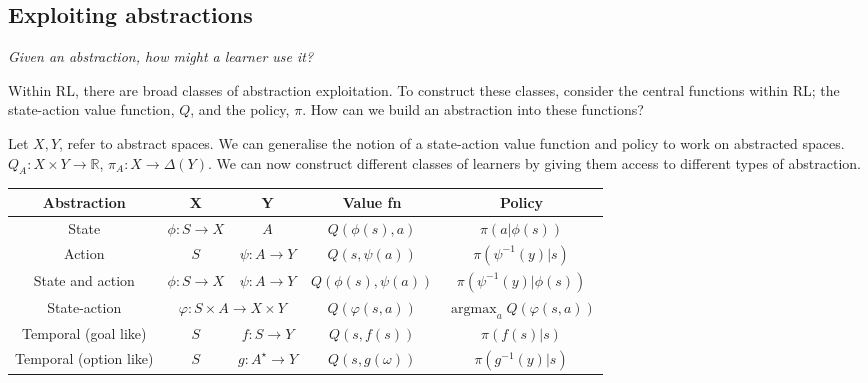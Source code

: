 \subsection{Exploiting abstractions}\label{exploit-abstraction-rl}

%

\begin{displayquote}
\textsl{Given an abstraction, how might a learner use it?}
\end{displayquote}

Within RL, there are broad classes of abstraction exploitation. To construct these classes,
consider the central functions within RL; the state-action value function, $Q$, and the policy, $\pi$.
How can we build an abstraction into these functions?

Let $X, Y$, refer to abstract spaces. We can generalise the notion of a state-action value function and policy to work on abstracted spaces.
$Q_A: X \times Y \to \mathbb R$, $\pi_A: X \to \Delta(Y)$. We can now construct
different classes of learners by giving them access to different types of abstraction.

\vspace{5mm}

\begin{changemargin}{-3cm}{-3cm}
  \begin{center}
    \begin{tabular}{ c || c | c | c | c }
      Abstraction & \textbf{X} & \textbf{Y} & \textbf{Value fn} & \textbf{Policy} \\ \hline \hline
      State & $\phi: S \to X$ & $A$ & $Q(\phi(s), a)$ & $\pi(a| \phi(s))$ \\ \hline
      Action & $S$ & $\psi: A \to Y$ & $Q(s, \psi(a))$ & $\pi(\psi^{-1}(y) | s)$\\ \hline
      State and action \footnotemark & $\phi: S \to X$ & $\psi: A \to Y$ & $Q(\phi(s), \psi(a))$ & $\pi(\psi^{-1}(y) | \phi(s))$ \\ \hline
      State-action & \multicolumn{2}{c|}{$\varphi: S\times A \to X\times Y$} & $Q(\varphi(s, a))$ & $\mathop{\text{argmax}}_a Q(\varphi(s, a))$ \\ \hline
      Temporal (goal like)\footnotemark & $S$ & $f: S \to Y$ & $Q(s, f(s))$ &  $\pi(f(s)|s)$ \\ \hline
      Temporal (option like) & $S$ & $g: A^{\star} \to Y$ & $Q(s, g(\omega))$ & $\pi(g^{-1}(y) | s)$ \\ \hline
    \end{tabular}
  \end{center}
\end{changemargin}

